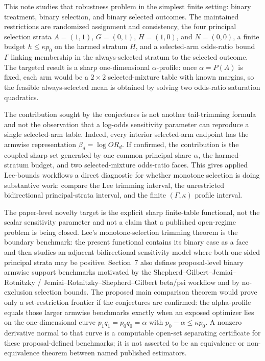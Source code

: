 \documentclass[11pt]{article}
\theoremstyle{definition}
\theoremstyle{plain}
\theoremstyle{remark}
\begin{document}
This note studies that robustness problem in the simplest finite setting:
binary treatment, binary selection, and binary selected outcomes.  The maintained
restrictions are randomized assignment and consistency, the four principal
selection strata \(A=(1,1)\), \(G=(0,1)\), \(H=(1,0)\), and \(N=(0,0)\), a finite
budget \(h\le \kappa p_0\) on the harmed stratum \(H\), and a selected-arm
odds-ratio bound \(\Gamma\) linking membership in the always-selected stratum
to the selected outcome.  The targeted result is a sharp one-dimensional
\(\alpha\)-profile: once \(\alpha=P(A)\) is fixed, each arm would be a \(2\times2\)
selected-mixture table with known margins, so the feasible always-selected mean
is obtained by solving two odds-ratio saturation quadratics.

The contribution sought by the conjectures is not another tail-trimming formula and not the observation
that a log-odds sensitivity parameter can reproduce a single selected-arm table.
Indeed, every interior selected-arm endpoint has the armwise representation
\(\beta_d=\log OR_d\).  If confirmed, the contribution is the coupled sharp set generated by
one common principal share \(\alpha\), the harmed-stratum budget, and two
selected-mixture odds-ratio faces.  This gives applied Lee-bounds workflows a
direct diagnostic for whether monotone selection is doing substantive work:
compare the Lee trimming interval, the unrestricted bidirectional
principal-strata interval, and the finite \((\Gamma,\kappa)\) profile interval.

The paper-level novelty target is the explicit sharp finite-table functional, not the
scalar sensitivity parameter and not a claim that a published open-regime
problem is being closed.  Lee's monotone-selection trimming theorem
is the boundary benchmark: the present functional contains its binary case as a
face and then studies an adjacent bidirectional sensitivity model where both
one-sided principal strata may be positive.  Section~7 also defines
proposal-level binary armwise support benchmarks motivated by the
Shepherd--Gilbert--Jemiai--Rotnitzky /
Jemiai--Rotnitzky--Shepherd--Gilbert beta/psi workflow and by no-exclusion
selection bounds.  The proposed main comparison theorem would prove only a
set-restriction frontier if the conjectures are confirmed: the alpha-profile
equals those larger armwise benchmarks exactly when
an exposed optimizer lies on the one-dimensional curve
\(p_1q_1=p_0q_0=\alpha\) with \(p_0-\alpha\le\kappa p_0\).  A nonzero
derivative normal to that curve is a computable open-set separating certificate
for these proposal-defined benchmarks; it is not asserted to be an equivalence
or non-equivalence theorem between named published estimators.
\end{document}
